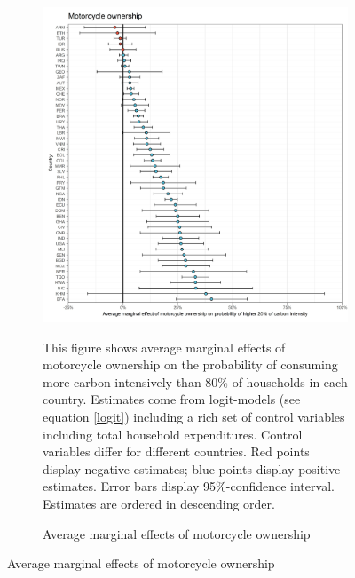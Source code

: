  \begin{figure}[ht!]\ContinuedFloat
   \centering
   \begin{subfigure}[b]{\textwidth}
   \centering
   \caption{Average marginal effects of motorcycle ownership} \label{fig:Logit_ME_motorcycle}
   \includegraphics{1_Figures/Analysis_Logit_Models_Marginal_Effects/Average_Marginal_Effects_affected_upper_80_motorcycle.01_2017.jpg}
   \begin{subcaption2}
     This figure shows average marginal effects of motorcycle ownership on the probability of consuming more carbon-intensively than 80\% of households in each country. Estimates come from logit-models (see equation \ref{logit}) including a rich set of control variables including total household expenditures. Control variables differ for different countries. Red points display negative estimates; blue points display positive estimates. Error bars display 95\%-confidence interval. Estimates are ordered in descending order.
   \end{subcaption2}
   \end{subfigure}
 \end{figure}
 \clearpage

